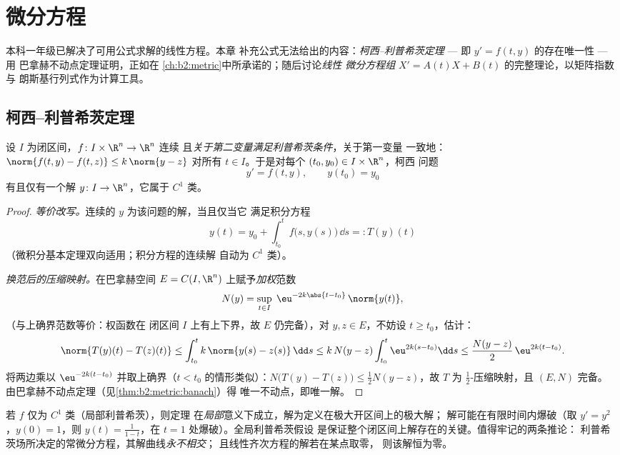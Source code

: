 \chapter{微分方程}\label{ch:b2:diffeq}

本科一年级已解决了可用公式求解的线性方程。本章
补充公式无法给出的内容：\emph{柯西--利普希茨定理}
--- 即 $y' = f(t, y)$ 的存在唯一性 --- 用
巴拿赫不动点定理证明，正如在
\cref{ch:b2:metric}中所承诺的；随后讨论\emph{线性
微分方程组} $X' = A(t)X + B(t)$ 的完整理论，以矩阵指数与
朗斯基行列式作为计算工具。

\section{柯西--利普希茨定理}

\begin{theorem}\label{thm:b2:diffeq:cauchylipschitz}
设 $I$ 为闭区间，$f \colon I \times \R^n \to \R^n$ 连续
且\emph{关于第二变量满足利普希茨条件}，关于第一变量
一致地：$\norm{f(t, y) - f(t, z)} \leq k\,\norm{y - z}$ 对所有 $t
\in I$。于是对每个 $(t_0, y_0) \in I \times \R^n$，柯西
问题
\[
y' = f(t, y), \qquad y(t_0) = y_0
\]
有且仅有一个解 $y \colon I \to \R^n$，它属于 $C^1$ 类。
\end{theorem}

\begin{proof}
\emph{等价改写。}连续的 $y$ 为该问题的解，当且仅当它
满足积分方程
\[
y(t) = y_0 + \int_{t_0}^{t} f\bigl(s, y(s)\bigr)\,\dd s
=: T(y)(t)
\]
（微积分基本定理双向适用；积分方程的连续解
自动为 $C^1$ 类）。

\emph{换范后的压缩映射。}在巴拿赫空间 $E =
C(I, \R^n)$ 上赋予\emph{加权}范数
\[
N(y) = \sup_{t \in I}\; \eu^{-2k\abs{t - t_0}}\,\norm{y(t)} ,
\]
（与上确界范数等价：权函数在
闭区间 $I$ 上有上下界，故 $E$ 仍完备），对 $y, z \in
E$，不妨设 $t \geq t_0$，估计：
\[
\norm{T(y)(t) - T(z)(t)}
\leq \int_{t_0}^{t} k\,\norm{y(s) - z(s)}\,\dd s
\leq k\,N(y - z)\int_{t_0}^{t} \eu^{2k(s - t_0)}\dd s
\leq \frac{N(y-z)}{2}\,\eu^{2k(t - t_0)} .
\]
将两边乘以 $\eu^{-2k(t - t_0)}$ 并取上确界（$t
< t_0$ 的情形类似）：$N\bigl(T(y) - T(z)\bigr) \leq \frac12 N(y -
z)$，故 $T$ 为 $\frac12$-压缩映射，且 $(E, N)$ 完备。
由巴拿赫不动点定理（见\cref{thm:b2:metric:banach}）得
唯一不动点，即唯一解。
\end{proof}

\begin{remark}
若 $f$ 仅为 $C^1$ 类（局部利普希茨），则定理
在\emph{局部}意义下成立，解为定义在极大开区间上的极大解；
解可能在有限时间内爆破（取 $y' = y^2$，$y(0) = 1$，则 $y(t)
= \frac{1}{1-t}$，在 $t = 1$ 处爆破）。全局利普希茨假设
是保证整个闭区间上解存在的关键。值得牢记的两条推论：
利普希茨场所决定的常微分方程，其解曲线\emph{永不相交}；
且线性齐次方程的解若在某点取零，
则该解恒为零。
\end{remark}

